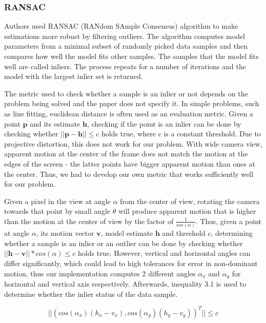 \documentclass[11pt,english]{report}
\begin{document}
\subsubsection{RANSAC}

Authors used RANSAC\cite{FISCHLER1987726} (RANdom SAmple Consensus) algorithm to make estimations more robust by filtering outliers. The algorithm computes model parameters from a minimal subset of randomly picked data samples and then compares how well the model fits other samples. The samples that the model fits well are called inliers. The process repeats for a number of iterations and the model with the largest inlier set is returned.

The metric used to check whether a sample is an inlier or not depends on the problem being solved and the paper does not specify it. In simple problems, such as line fitting, euclidean distance is often used as an evaluation metric. Given a point $\mathbf{p}$ and its estimate $\mathbf{h}$, checking if the point is an inlier can be done by checking whether $||\mathbf{p} - \mathbf{h}|| \leq c$ holds true, where $c$ is a constant threshold. Due to projective distortion, this does not work for our problem. With wide camera view, apparent motion at the center of the frame does not match the motion at the edges of the screen - the latter points have bigger apparent motion than ones at the center. Thus, we had to develop our own metric that works sufficiently well for our problem.

Given a pixel in the view at angle $\alpha$ from the center of view, rotating the camera towards that point by small angle $\theta$ will produce apparent motion that is higher than the motion at the center of view by the factor of $\frac{1}{cos(\alpha)}$. Thus, given a point at angle $\alpha$, its motion vector $\mathbf{v}$, model estimate $\mathbf{h}$ and threshold $c$, determining whether a sample is an inlier or an outlier can be done by checking whether $||\mathbf{h} - \mathbf{v}|| * cos(\alpha) \leq c$ holds true. However, vertical and horizontal angles can differ significantly, which could lead to high tolerances for error in non-dominant motion, thus our implementation computes 2 different angles $\alpha_x$ and $\alpha_y$ for horizontal and vertical axis respectively. Afterwards, inequality 3.1 is used to determine whether the inlier status of the data sample.

\begin{equation}
	||(cos(\alpha_x) (h_x - v_x), cos(\alpha_y) (h_y - v_y))^T|| \leq c
\end{equation}
\end{document}
